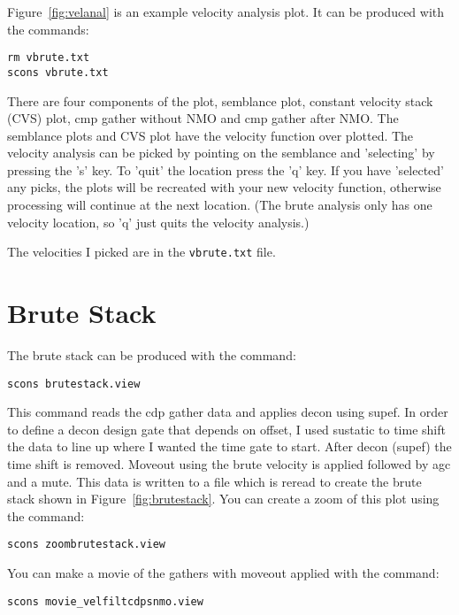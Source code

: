Figure~\ref{fig:velanal} is an example velocity analysis plot.  It can 
be produced with the commands: 
\begin{verbatim}
rm vbrute.txt 
scons vbrute.txt
\end{verbatim}

There are four components of the plot, semblance plot, constant velocity 
stack (CVS) plot, cmp gather without NMO and cmp gather after NMO.  The 
semblance plots and CVS plot have the velocity function over plotted.  
The velocity analysis can be picked by pointing on the semblance and 
'selecting' by pressing the 's' key.  To 'quit' the location press the 
'q' key.  If you have 'selected' any picks, the plots will be recreated 
with your new velocity function, otherwise processing will continue at 
the next location.  (The brute analysis only has one velocity location, 
so 'q' just quits the velocity analysis.)

The velocities I picked are in the \texttt{vbrute.txt} file.


\section{Brute Stack}
The brute stack can be produced with the command: 
\begin{verbatim}
scons brutestack.view
\end{verbatim}

This command reads the cdp gather data and applies decon using supef.  In 
order to define a decon design gate that depends on offset, I used sustatic 
to time shift the data to line up where I wanted the time gate to start.  
After decon (supef) the time shift is removed.  Moveout using the brute 
velocity is applied followed by agc and a mute.  This data is written to a 
file which is reread to create the brute stack shown in 
Figure~\ref{fig:brutestack}.  You can create a zoom of this plot using the 
command:
\begin{verbatim}
scons zoombrutestack.view
\end{verbatim}

You can make a movie of the gathers with moveout applied with the
command: 
\begin{verbatim}
scons movie_velfiltcdpsnmo.view
\end{verbatim}


